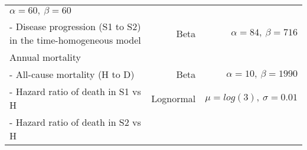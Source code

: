\documentclass[]{article}
\begin{document}
\begin{longtable}[]{@{}lrr@{}}
\begin{minipage}[t]{0.42\columnwidth}
\(\alpha=60, \ \beta=60\)\strut
\end{minipage}\tabularnewline
\begin{minipage}[t]{0.32\columnwidth}\raggedright\strut
- Disease progression (S1 to S2) in the time-homogeneous model\strut
\end{minipage} & \begin{minipage}[t]{0.17\columnwidth}\raggedleft\strut
Beta\strut
\end{minipage} & \begin{minipage}[t]{0.42\columnwidth}\raggedleft\strut
\(\alpha=84, \ \beta=716\)\strut
\end{minipage}\tabularnewline
\begin{minipage}[t]{0.32\columnwidth}\raggedright\strut
Annual mortality\strut
\end{minipage} & \begin{minipage}[t]{0.17\columnwidth}\raggedleft\strut
\strut
\end{minipage} & \begin{minipage}[t]{0.42\columnwidth}\raggedleft\strut
\strut
\end{minipage}\tabularnewline
\begin{minipage}[t]{0.32\columnwidth}\raggedright\strut
- All-cause mortality (H to D)\strut
\end{minipage} & \begin{minipage}[t]{0.17\columnwidth}\raggedleft\strut
Beta\strut
\end{minipage} & \begin{minipage}[t]{0.42\columnwidth}\raggedleft\strut
\(\alpha=10, \ \beta=1990\)\strut
\end{minipage}\tabularnewline
\begin{minipage}[t]{0.32\columnwidth}\raggedright\strut
- Hazard ratio of death in S1 vs H\strut
\end{minipage} & \begin{minipage}[t]{0.17\columnwidth}\raggedleft\strut
Lognormal\strut
\end{minipage} & \begin{minipage}[t]{0.42\columnwidth}\raggedleft\strut
\(\mu = log(3), \ \sigma = 0.01\)\strut
\end{minipage}\tabularnewline
\begin{minipage}[t]{0.32\columnwidth}\raggedright\strut
- Hazard ratio of death in S2 vs H\strut
\end{minipage} & \begin{minipage}[t]{0.17\columnwidth}\raggedleft\strut

\end{minipage}
\end{longtable}
\end{document}

